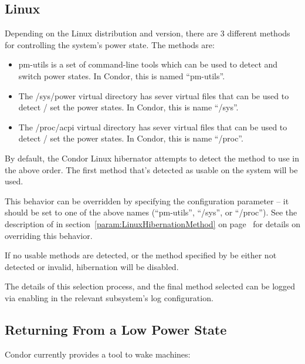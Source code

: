 \subsection{Linux}
Depending on the Linux distribution and version, there are 3 different
methods for controlling the system's power state.  The methods are:
\begin{itemize}
\item pm-utils is a set of command-line tools which can be used to
  detect and switch power states.  In Condor, this is named ``pm-utils''.
\item The /sys/power virtual directory has sever virtual files that
  can be used to detect / set the power states.  In Condor, this is
  name ``/sys''.
\item The /proc/acpi virtual directory has sever virtual files that
  can be used to detect / set the power states.  In Condor, this is
  name ``/proc''.
\end{itemize}

By default, the Condor Linux hibernator attempts to detect the method
to use in the above order.  The first method that's detected as usable
on the system will be used.

This behavior can be overridden by specifying the
 configuration parameter -- it
should be set to one of the above names (``pm-utils'', ``/sys'', or
``/proc'').
See the description of  in
section~\ref{param:LinuxHibernationMethod} on
page~\pageref{param:LinuxHibernationMethod}
for details on overriding this behavior.

If no usable methods are detected, or the method specified by
 be either not detected or
invalid, hibernation will be disabled.

The details of this selection process, and the final method selected
can be logged via enabling  in the relevant
subsystem's log configuration.


\subsection{Returning From a Low Power State}

Condor currently provides a tool  to wake machines:

